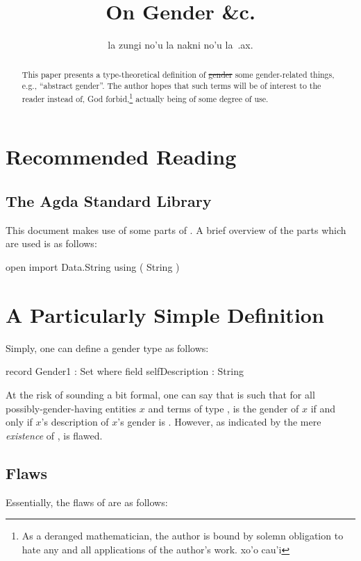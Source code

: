\documentclass{article}
\title{On Gender \&c.}
\author{la zungi no'u la nakni no'u la\ .ax.}
\begin{document}
\maketitle{}

\begin{abstract}
This paper presents a type-theoretical definition of \st{gender} some gender-related things, e.g., ``abstract gender''.  The author hopes that such terms will be of interest to the reader instead of, God forbid,\footnote{As a deranged mathematician, the author is bound by solemn obligation to hate any and all applications of the author's work.  xo'o cau'i} actually being of some degree of use.
\end{abstract}

\section{Recommended Reading}

\subsection{The Agda Standard Library}
This document makes use of some parts of \textcite{agdaStdlib}.  A brief overview of the parts which are used is as follows:

\begin{code}
open import Data.String
  using
    ( String
    )
\end{code}

\section{A Particularly Simple Definition}
Simply, one can define a gender type  as follows:

\begin{code}
record Gender1 : Set where
  field
    selfDescription : String
\end{code}

At the risk of sounding a bit formal, one can say that  is such that for all possibly-gender-having entities \(x\) and terms  of type ,  is the gender of \(x\) if and only if \(x\)'s description of \(x\)'s gender is  .  However, as indicated by the mere \emph{existence} of ,  is flawed.

\subsection{Flaws}\label{sec:gender1flaws}
Essentially, the flaws of  are as follows:
\end{document}
